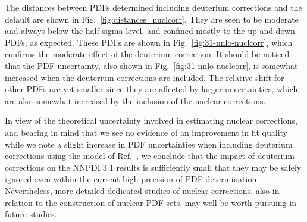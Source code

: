 The distances between PDFs determined including deuterium corrections
and the default are shown in Fig.~\ref{fig:distances_nuclcorr}. They
are seen to be moderate and always below the half-sigma level, and confined mostly to the up and down PDFs, as expected. These PDFs  
are  shown in Fig.~\ref{fig:31-nnlo-nuclcorr}, which confirms the
moderate effect of the deuterium correction.
It should be noticed that the PDF uncertainty, also
shown in Fig.~\ref{fig:31-nnlo-nuclcorr}, is somewhat increased when
the deuterium corrections are included. The relative shift for other
PDFs are yet smaller since they are affected by larger uncertainties,
which are also somewhat increased by the inclusion of the nuclear corrections.




In view of the theoretical uncertainty involved in estimating nuclear
corrections, and bearing in mind that we see no evidence of an
improvement in fit quality while we note a slight increase in PDF
uncertainties when including deuterium corrections using the model of
Ref.~\cite{Harland-Lang:2014zoa}, we conclude that the impact of
deuterium corrections on the NNPDF3.1 results is sufficiently small that they
may be safely ignored even within the current high precision of PDF
determination. Nevertheless, more detailed dedicated studies of
nuclear corrections, also in relation to the construction of nuclear
PDF sets, may well be worth pursuing in future studies.

